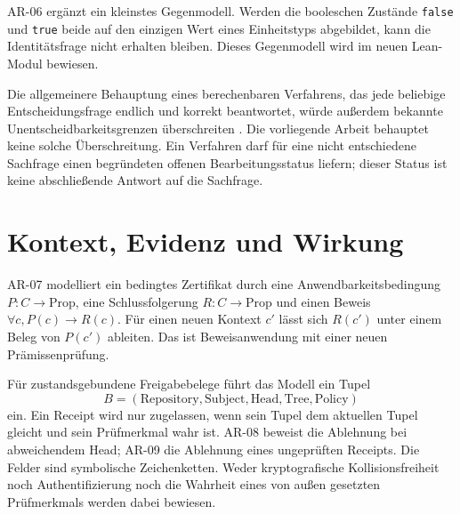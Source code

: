 \documentclass[11pt,a4paper]{article}
\newcommand{\AR}[1]{\textsf{AR-#1}}
\begin{document}
\AR{06} ergänzt ein kleinstes Gegenmodell. Werden die booleschen Zustände
\texttt{false} und \texttt{true} beide auf den einzigen Wert eines Einheitstyps
abgebildet, kann die Identitätsfrage nicht erhalten bleiben. Dieses Gegenmodell
wird im neuen Lean-Modul bewiesen.

Die allgemeinere Behauptung eines berechenbaren Verfahrens, das jede beliebige
Entscheidungsfrage endlich und korrekt beantwortet, würde außerdem bekannte
Unentscheidbarkeitsgrenzen überschreiten \cite{turing}. Die vorliegende Arbeit
behauptet keine solche Überschreitung. Ein Verfahren darf für eine nicht
entschiedene Sachfrage einen begründeten offenen Bearbeitungsstatus liefern;
dieser Status ist keine abschließende Antwort auf die Sachfrage.

\section{Kontext, Evidenz und Wirkung}\label{sec:bindings}
\AR{07} modelliert ein bedingtes Zertifikat durch eine Anwendbarkeitsbedingung
$P:C\to\mathrm{Prop}$, eine Schlussfolgerung $R:C\to\mathrm{Prop}$ und einen
Beweis $\forall c, P(c)\to R(c)$. Für einen neuen Kontext $c'$ lässt sich $R(c')$
unter einem Beleg von $P(c')$ ableiten. Das ist Beweisanwendung mit einer neuen
Prämissenprüfung.

Für zustandsgebundene Freigabebelege führt das Modell ein Tupel
\[
 B=(\text{Repository},\text{Subject},\text{Head},\text{Tree},\text{Policy})
\]
ein. Ein Receipt wird nur zugelassen, wenn sein Tupel dem aktuellen Tupel gleicht
und sein Prüfmerkmal wahr ist. \AR{08} beweist die Ablehnung bei abweichendem Head;
\AR{09} die Ablehnung eines ungeprüften Receipts. Die Felder sind symbolische
Zeichenketten. Weder kryptografische Kollisionsfreiheit noch Authentifizierung
noch die Wahrheit eines von außen gesetzten Prüfmerkmals werden dabei bewiesen.
\end{document}
